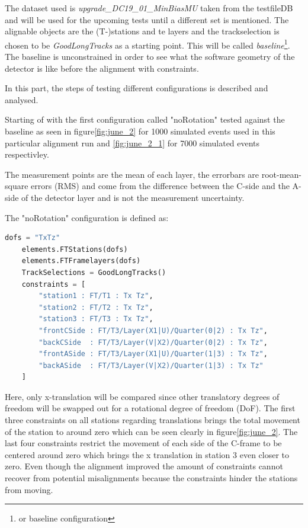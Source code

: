 The dataset used is \textit{upgrade\_DC19\_01\_MinBiasMU} taken from the testfileDB\cite{testDB} and will be used for the upcoming tests until a different set is mentioned.
The alignable objects are the (T-)stations and te layers and the trackselection is chosen to be \textit{GoodLongTracks} as a starting point. This will be called \textit{baseline}\footnote{or baseline configuration}.
The baseline is unconstrained in order to see what the software geometry of the detector is like before the alignment with constraints.

In this part, the steps of testing different configurations is described and analysed.

Starting of with the first configuration called "noRotation" tested against the baseline as seen in figure\ref{fig:june_2} for 1000 simulated events used in this particular alignment run and \ref{fig:june_2_1} for 7000 simulated events respectivley.

The measurement points are the mean of each layer, the errorbars are root-mean-square errors (RMS) and come from the difference between the C-side and the A-side of the detector layer and is not the measurement uncertainty.

The "noRotation" configuration is defined as:

\begin{lstlisting}[language=Python]
    dofs = "TxTz"
    elements.FTStations(dofs)
    elements.FTFramelayers(dofs)
    TrackSelections = GoodLongTracks()
    constraints = [
        "station1 : FT/T1 : Tx Tz",
        "station2 : FT/T2 : Tx Tz",
        "station3 : FT/T3 : Tx Tz",
        "frontCSide : FT/T3/Layer(X1|U)/Quarter(0|2) : Tx Tz",
        "backCSide  : FT/T3/Layer(V|X2)/Quarter(0|2) : Tx Tz",
        "frontASide : FT/T3/Layer(X1|U)/Quarter(1|3) : Tx Tz",
        "backASide  : FT/T3/Layer(V|X2)/Quarter(1|3) : Tx Tz"
    ]
\end{lstlisting}

Here, only x-translation will be compared since other translatory degrees of freedom will be swapped out for a rotational degree of freedom (DoF).
The first three constraints on all stations regarding translations brings the total movement of the station to around zero which can be seen clearly in figure\ref{fig:june_2}. The last four constraints restrict the movement of each
side of the C-frame to be centered around zero which brings the x translation in station 3 even closer to zero.
Even though the alignment improved the amount of constraints cannot recover from potential misalignments because the constraints hinder the stations from moving.

